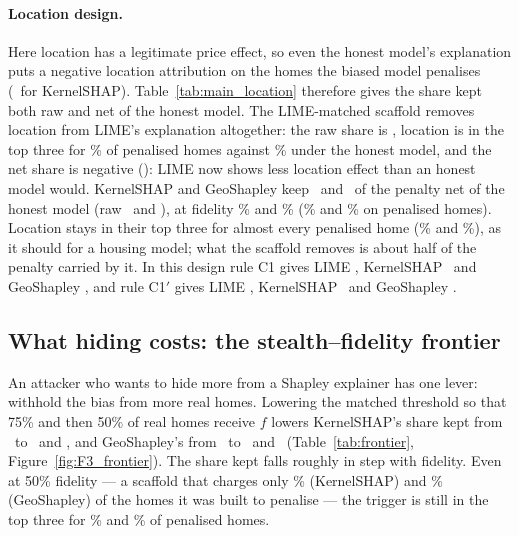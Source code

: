 \paragraph{Location design.} Here location has a legitimate price effect, so even the honest model's explanation
puts a negative location attribution on the homes the biased model penalises (\LKernelSHAPHonestSigned\ for
KernelSHAP). Table~\ref{tab:main_location} therefore gives the share kept both raw and net of the honest model. The
LIME-matched scaffold removes location from LIME's explanation altogether: the raw share is \LLIMEMatKeptRaw, location
is in the top three for \LLIMEMatTopPen\% of penalised homes against \LLIMEHonestTopPen\% under the honest model, and
the net share is negative (\LLIMEMatKept): LIME now shows less location effect than an honest model would. KernelSHAP and
GeoShapley keep \LKernelSHAPMatKept\ and \LGeoShapleyMatKept\ of the penalty net of the honest model (raw
\LKernelSHAPMatKeptRaw\ and \LGeoShapleyMatKeptRaw), at fidelity \LKernelSHAPMatFid\% and \LGeoShapleyMatFid\%
(\LKernelSHAPMatFidPen\% and \LGeoShapleyMatFidPen\% on penalised homes). Location stays in their top three for
almost every penalised home (\LKernelSHAPMatTopPen\% and \LGeoShapleyMatTopPen\%), as it should for a housing model;
what the scaffold removes is about half of the penalty carried by it. In this design rule C1 gives
LIME \RuleConeLocationLIME, KernelSHAP \RuleConeLocationKernelSHAP\ and GeoShapley \RuleConeLocationGeoShapley, and
rule C1$'$ gives LIME \RuleConePrimeLocationLIME, KernelSHAP \RuleConePrimeLocationKernelSHAP\ and GeoShapley
\RuleConePrimeLocationGeoShapley.


\subsection{What hiding costs: the stealth--fidelity frontier}

An attacker who wants to hide more from a Shapley explainer has one lever: withhold the bias from more real homes.
Lowering the matched threshold so that 75\% and then 50\% of real homes receive $f$ lowers KernelSHAP's share kept
from \FKernelSHAPMatKept\ to \FKernelSHAPMatSeventyFiveKept\ and \FKernelSHAPMatFiftyKept, and GeoShapley's from
\FGeoShapleyMatKept\ to \FGeoShapleyMatSeventyFiveKept\ and \FGeoShapleyMatFiftyKept\ (Table~\ref{tab:frontier},
Figure~\ref{fig:F3_frontier}). The share kept falls roughly in step with fidelity. Even at 50\% fidelity --- a
scaffold that charges only \FKernelSHAPMatFiftyFidPen\% (KernelSHAP) and \FGeoShapleyMatFiftyFidPen\% (GeoShapley) of
the homes it was built to penalise --- the trigger is still in the top three for \FKernelSHAPMatFiftyTopPen\% and
\FGeoShapleyMatFiftyTopPen\% of penalised homes.

